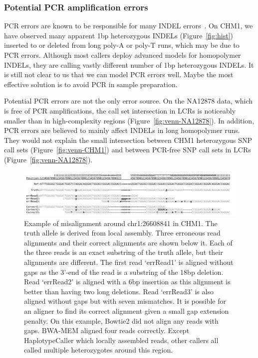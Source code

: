 \documentclass{bioinfo}
\begin{document}
\subsubsection{Potential PCR amplification errors}
PCR errors are known to be responsible for many INDEL
errors~\citep{1000g:2012aa}. On CHM1, we have observed many apparent 1bp
heterozygous INDELs (Figure~\ref{fig:hist}) inserted to or deleted from long
poly-A or poly-T runs, which may be due to PCR errors. Although most callers
deploy advanced models for homopolymer INDELs, they are calling vastly
different number of 1bp heterozygous INDELs. It is still not clear to us that
we can model PCR errors well. Maybe the most effective solution
is to avoid PCR in sample preparation.

Potential PCR errors are not the only error source. On the NA12878 data, which
is free of PCR amplifications, the call set intersection in LCRs is noticeably
smaller than in high-complexity regions (Figure~\ref{fig:venn-NA12878}). In
addition, PCR errors are believed to mainly affect INDELs in long homopolymer
runs. They would not explain the small intersection between CHM1 heterozygous
SNP call sets (Figure~\ref{fig:venn-CHM1}) and between PCR-free SNP call sets
in LCRs (Figure~\ref{fig:venn-NA12878}).

\begin{figure}
\includegraphics[width=\textwidth]{indel-exam}
\caption{Example of misalignment around chr1:26608841 in CHM1. The truth allele
is derived from local assembly. Three erroneous read alignments and their
correct alignments are shown below it. Each of the three reads is an exact
substring of the truth allele, but their alignments are different.  The first
read `errRead1' is aligned without gaps as the 3'-end of the read is a
substring of the 18bp deletion.  Read `errRead2' is aligned with a 6bp
insertion as this alignment is better than having two long deletions. Read
`errRead3' is also aligned without gaps but with seven mismatches. It is
possible for an aligner to find its correct alignment given a small gap
extension penalty. On this example, Bowtie2 did not align any reads with gaps.
BWA-MEM aligned four reads correctly. Except HaplotypeCaller which locally
assembled reads, other callers all called multiple heterozygotes around this
region.}\label{fig:realign}
\end{figure}
\end{document}
